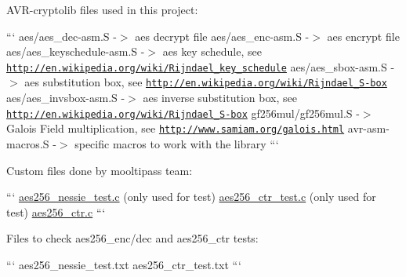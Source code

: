 \begin{DoxyItemize}
\item A\+V\+R-\/cryptolib files used in this project\+:
\end{DoxyItemize}

``` aes/aes\+\_\+dec-\/asm.\+S -\/$>$ aes decrypt file aes/aes\+\_\+enc-\/asm.\+S -\/$>$ aes encrypt file aes/aes\+\_\+keyschedule-\/asm.\+S -\/$>$ aes key schedule, see \href{http://en.wikipedia.org/wiki/Rijndael_key_schedule}{\tt http\+://en.\+wikipedia.\+org/wiki/\+Rijndael\+\_\+key\+\_\+schedule} aes/aes\+\_\+sbox-\/asm.\+S -\/$>$ aes substitution box, see \href{http://en.wikipedia.org/wiki/Rijndael_S-box}{\tt http\+://en.\+wikipedia.\+org/wiki/\+Rijndael\+\_\+\+S-\/box} aes/aes\+\_\+invsbox-\/asm.\+S -\/$>$ aes inverse substitution box, see \href{http://en.wikipedia.org/wiki/Rijndael_S-box}{\tt http\+://en.\+wikipedia.\+org/wiki/\+Rijndael\+\_\+\+S-\/box} gf256mul/gf256mul.\+S -\/$>$ Galois Field multiplication, see \href{http://www.samiam.org/galois.html}{\tt http\+://www.\+samiam.\+org/galois.\+html} avr-\/asm-\/macros.\+S -\/$>$ specific macros to work with the library ```


\begin{DoxyItemize}
\item Custom files done by mooltipass team\+:
\end{DoxyItemize}

``` \hyperlink{aes256__nessie__test_8c}{aes256\+\_\+nessie\+\_\+test.\+c} (only used for test) \hyperlink{aes256__ctr__test_8c}{aes256\+\_\+ctr\+\_\+test.\+c} (only used for test) \hyperlink{aes256__ctr_8c}{aes256\+\_\+ctr.\+c} ```


\begin{DoxyItemize}
\item Files to check aes256\+\_\+enc/dec and aes256\+\_\+ctr tests\+:
\end{DoxyItemize}

``` aes256\+\_\+nessie\+\_\+test.\+txt aes256\+\_\+ctr\+\_\+test.\+txt ``` 